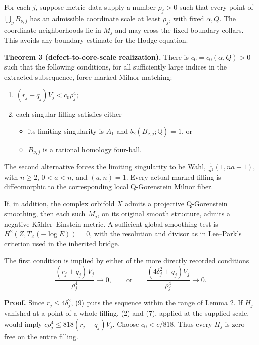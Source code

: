 \documentclass[
  11pt,
]{article}
\providecommand{\tightlist}{%
  \setlength{\itemsep}{0pt}\setlength{\parskip}{0pt}}
\begin{document}
For each \(j\), suppose metric data supply a number \(\rho_j>0\) such
that every point of \(\bigcup_\nu B_{\nu,j}\) has an admissible
coordinate scale at least \(\rho_j\), with fixed \(\alpha,Q\). The
coordinate neighborhoods lie in \(M_j\) and may cross the fixed boundary
collars. This avoids any boundary estimate for the Hodge equation.

\textbf{Theorem 3 (defect-to-core-scale realization).} There is
\(c_0=c_0(\alpha,Q)>0\) such that the following conditions, for all
sufficiently large indices in the extracted subsequence, force marked
Milnor matching:

\begin{enumerate}
\def\labelenumi{\arabic{enumi}.}
\tightlist
\item
  \((r_j+q_j)V_j<c_0\rho_j^4\);
\item
  each singular filling satisfies either

  \begin{itemize}
  \tightlist
  \item
    its limiting singularity is \(A_1\) and
    \(b_2(B_{\nu,j};\mathbb Q)=1\), or
  \item
    \(B_{\nu,j}\) is a rational homology four-ball.
  \end{itemize}
\end{enumerate}

The second alternative forces the limiting singularity to be Wahl,
\(\frac1{n^2}(1,na-1)\), with \(n\ge2\), \(0<a<n\), and \((a,n)=1\).
Every actual marked filling is diffeomorphic to the corresponding local
Q-Gorenstein Milnor fiber.

If, in addition, the complex orbifold \(X\) admits a projective
Q-Gorenstein smoothing, then each such \(M_j\), on its original smooth
structure, admits a negative Kähler--Einstein metric. A sufficient
global smoothing test is \(H^2(Z,T_Z(-\log E))=0\), with the resolution
and divisor as in Lee--Park's criterion used in the inherited bridge.

The first condition is implied by either of the more directly recorded
conditions \[
           \frac{(r_j+q_j)V_j}{\rho_j^4}\longrightarrow0,
 \qquad\text{or}\qquad
           \frac{(4\delta_j^2+q_j)V_j}{\rho_j^4}
                                     \longrightarrow0.          \tag{10}
\]

\textbf{Proof.} Since \(r_j\le4\delta_j^2\), (9) puts the sequence
within the range of Lemma 2. If \(H_j\) vanished at a point of a whole
filling, (2) and (7), applied at the supplied scale, would imply
\(c\rho_j^4\le818(r_j+q_j)V_j\). Choose \(c_0<c/818\). Thus every
\(H_j\) is zero-free on the entire filling.
\end{document}
